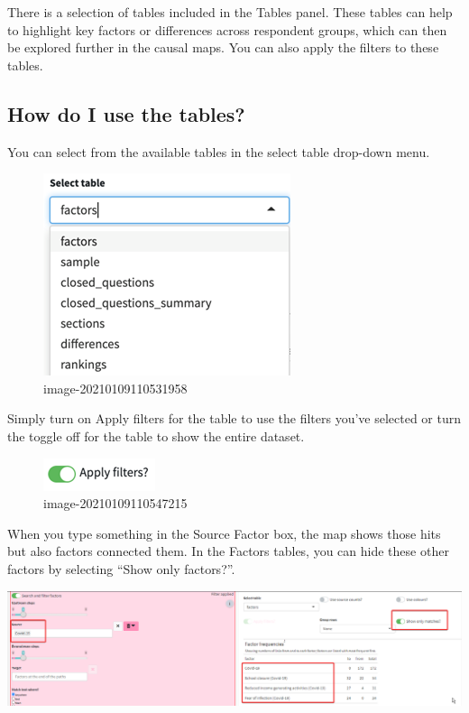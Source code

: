 \documentclass[
]{book}
\begin{document}
There is a selection of tables included in the Tables panel. These tables can help to highlight key factors or differences across respondent groups, which can then be explored further in the causal maps. You can also apply the filters to these tables.

\hypertarget{how-do-i-use-the-tables}{%
\subsection{How do I use the tables?}\label{how-do-i-use-the-tables}}

You can select from the available tables in the select table drop-down menu.

\begin{figure}
\centering
\includegraphics{_assets/image-20210109110531958.png}
\caption{image-20210109110531958}
\end{figure}

Simply turn on Apply filters for the table to use the filters you've selected or turn the toggle off for the table to show the entire dataset.

\begin{figure}
\centering
\includegraphics{_assets/image-20210109110547215.png}
\caption{image-20210109110547215}
\end{figure}

When you type something in the Source Factor box, the map shows those hits but also factors connected them. In the Factors tables, you can hide these other factors by selecting ``Show only factors?''.

\includegraphics{_assets/090000.png}
\end{document}

